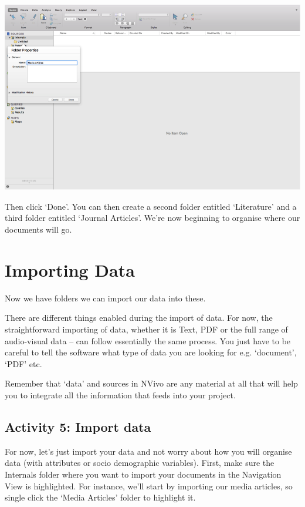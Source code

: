 \documentclass[]{book}
\theoremstyle{definition}
\theoremstyle{definition}
\theoremstyle{definition}
\theoremstyle{remark}
\begin{document}
\includegraphics{imgs/qual_12.png}

Then click `Done'. You can then create a second folder entitled
`Literature' and a third folder entitled `Journal Articles'. We're now
beginning to organise where our documents will go.

\hypertarget{importing-data}{%
\section{Importing Data}\label{importing-data}}

Now we have folders we can import our data into these.

There are different things enabled during the import of data. For now,
the straightforward importing of data, whether it is Text, PDF or the
full range of audio-visual data -- can follow essentially the same
process. You just have to be careful to tell the software what type of
data you are looking for e.g. `document', `PDF' etc.

Remember that `data' and sources in NVivo are any material at all that
will help you to integrate all the information that feeds into your
project.

\hypertarget{activity-5-import-data}{%
\subsection{Activity 5: Import data}\label{activity-5-import-data}}

For now, let's just import your data and not worry about how you will
organise data (with attributes or socio demographic variables). First,
make sure the Internals folder where you want to import your documents
in the Navigation View is highlighted. For instance, we'll start by
importing our media articles, so single click the `Media Articles'
folder to highlight it.
\end{document}
